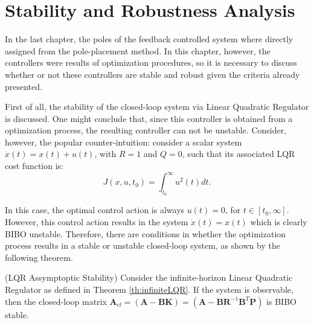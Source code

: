 \documentclass[a4paper,11pt]{book}
\numberwithin{figure}{chapter}
\numberwithin{equation}{chapter}
\numberwithin{table}{chapter}
\newtheorem{theorem}{Theorem}[chapter]
\theoremstyle{definition}
\newcounter{boxed-theorem}
\newenvironment{boxed-theorem}[1]
{\begin{shaded} \begin{theorem}{#1}}
{\end{theorem} \end{shaded}}
\newcounter{boxed-definition}
\begin{document}
\section{Stability and Robustness Analysis}

In the last chapter, the poles of the feedback controlled system where directly assigned from the pole-placement method. In this chapter, however, the controllers were results of optimization procedures, so it is necessary to discuss whether or not these controllers are stable and robust given the criteria already presented. 

First of all, the stability of the closed-loop system via Linear Quadratic Regulator is discussed. One might conclude that, since this controller is obtained from a optimization process, the resulting controller can not be unstable. Consider, however, the popular counter-intuition: consider a scalar system $\dot{x}(t) = x(t) + u(t)$, with $R = 1$ and $Q = 0$, such that its associated LQR cost function is:
\begin{equation}
    J(x,u,t_0) = \int_{t_0}^{\infty} u^2(t) dt
.\end{equation}

In this case, the optimal control action is always $u(t) = 0$, for $t \in [t_0, \infty]$. However, this control action results in the system $\dot{x}(t) = x(t)$ which is clearly BIBO unstable. Therefore, there are conditions in whether the optimization process results in a stable or unstable closed-loop system, as shown by the following theorem.

\begin{boxed-theorem}{(LQR Assymptoptic Stability)} \label{th:lqrStab}
    Consider the infinite-horizon Linear Quadratic Regulator as defined in Theorem \ref{th:infiniteLQR}. If the system is observable, then the closed-loop matrix $\bm{A}_{cl} = (\bm{A} - \bm{B}\bm{K}) = (\bm{A} - \bm{B}\bm{R}^{-1}\bm{B}^T\bm{P})$ is BIBO stable.
\end{boxed-theorem}
\end{document}
